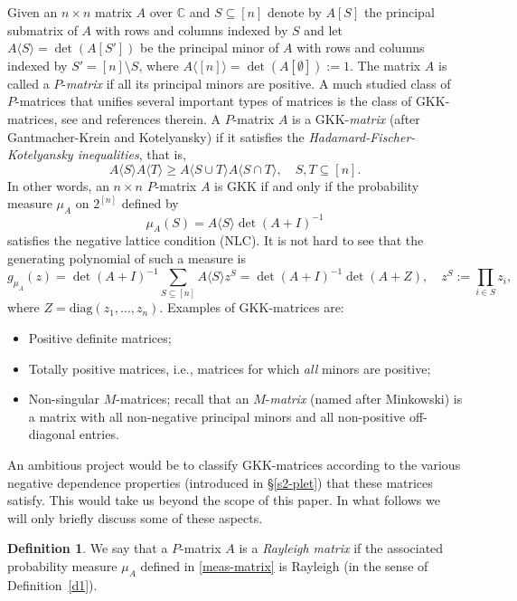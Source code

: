 \documentclass[10pt,reqno]{amsart}
\theoremstyle{plain}
\theoremstyle{definition}
\newtheorem{definition}{Definition}[section]
\theoremstyle{remark}
\newcommand{\GKK}{\text{GKK}}
\newcommand{\CC}{\mathbb{C}}
\begin{document}
Given an $n\times n$ matrix $A$ over $\CC$ and $S\subseteq [n]$ denote
by $A[S]$ the principal submatrix of $A$ with rows
and columns indexed by $S$ and let $A\langle S\rangle=\det(A[S'])$ be the 
principal minor of $A$ with rows
and columns indexed by $S'=[n]\setminus S$, where 
$A\langle [n]\rangle=\det(A[\emptyset]):=1$. The matrix $A$ is called  a
$P$-{\em matrix} if all its principal minors are positive. A much studied 
class of $P$-matrices that unifies several important types of matrices is 
the class of $\GKK$-matrices, see \cite{FJ,HS} and references 
therein. 
A $P$-matrix $A$ is a $\GKK$-{\em matrix} (after Gantmacher-Krein and
Kotelyansky) if it satisfies the {\em
Hadamard-Fischer-Kotelyansky inequalities}, that is,
\begin{equation}\label{eq-HFK}
A\langle S\rangle A\langle T\rangle \ge A\langle S\cup T\rangle A\langle
S\cap T\rangle,\quad S,T\subseteq [n].
\end{equation}
In other words, an $n \times n$ $P$-matrix $A$  is $\GKK$ if and only if
the probability measure $\mu_A$ on $2^{[n]}$ defined by
\begin{equation}\label{meas-matrix} 
\mu_A(S)= A\langle S \rangle\det(A+I)^{-1}
\end{equation}
satisfies the negative lattice condition (NLC). It is not hard to see that the
generating polynomial of such a measure is
$$
g_{\mu_A}(z) = \det(A+I)^{-1}\sum_{S \subseteq [n]} A\langle S \rangle
z^S=\det(A+I)^{-1}\det(A+Z),\quad z^S:= \prod_{i \in S}z_i,
$$
where  $Z=\text{diag}(z_1,\ldots,z_n)$. Examples of $\GKK$-matrices are:
\begin{itemize}
\item[(I)] Positive definite matrices;
\item[(II)] Totally positive matrices, i.e., matrices for which {\em all}
minors are positive;
\item[(III)] Non-singular $M$-matrices; recall that an $M$-{\em matrix}
(named after Minkowski) is a matrix with all non-negative principal minors 
and all non-positive off-diagonal entries.
\end{itemize}

An ambitious project would be to classify $\GKK$-matrices according to
the various negative dependence properties (introduced in \S \ref{s2-plet}) 
that these matrices satisfy. This would take us beyond the scope of this 
paper. In what follows we will only briefly discuss some of these aspects.

\begin{definition}\label{d-mat-ral}
We say that a $P$-matrix $A$ is a {\em Rayleigh matrix} if the associated 
probability measure $\mu_A$ defined in \eqref{meas-matrix} is Rayleigh 
(in the sense of Definition~\ref{d1}).
\end{definition} 
\end{document}
